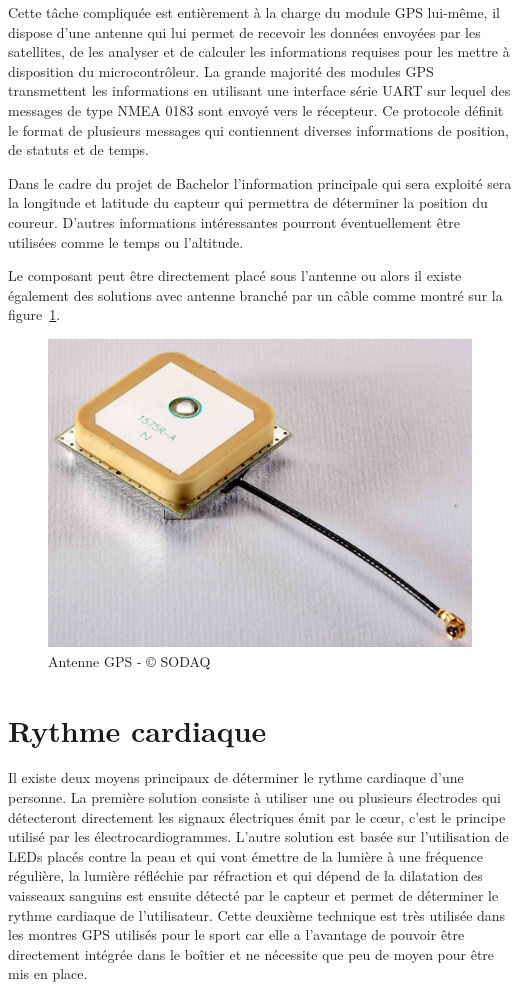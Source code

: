Cette tâche compliquée est entièrement à la charge du module GPS lui-même, il dispose d’une antenne qui lui permet de recevoir les données envoyées par les satellites, de les analyser et de calculer les informations requises pour les mettre à disposition du microcontrôleur.
La grande majorité des modules GPS transmettent les informations en utilisant une interface série UART sur lequel des messages de type NMEA 0183 sont envoyé vers le récepteur. Ce protocole définit le format de plusieurs messages qui contiennent diverses informations de position, de statuts et de temps. \cite{nmea_0183}

Dans le cadre du projet de Bachelor l’information principale qui sera exploité sera la longitude et latitude du capteur qui permettra de déterminer la position du coureur. D’autres informations intéressantes pourront éventuellement être utilisées comme le temps ou l’altitude.

Le composant peut être directement placé sous l’antenne ou alors il existe également des solutions avec antenne branché par un câble comme montré sur la figure~\ref{fig:antenne_gps}.

\begin{figure}[htb]
\centering 
\includegraphics[width=0.5\columnwidth]{../images/active-gps-antenna-large.jpg} 
\caption[Antenne GPS]{Antenne GPS - © SODAQ}
\label{fig:antenne_gps}
\end{figure}

\section{Rythme cardiaque}

Il existe deux moyens principaux de déterminer le rythme cardiaque d’une personne. La première solution consiste à utiliser une ou plusieurs électrodes qui détecteront directement les signaux électriques émit par le cœur, c’est le principe utilisé par les électrocardiogrammes. L’autre solution est basée sur l’utilisation de LEDs placés contre la peau et qui vont émettre de la lumière à une fréquence régulière, la lumière réfléchie par réfraction et qui dépend de la dilatation des vaisseaux sanguins est ensuite détecté par le capteur et permet de déterminer le rythme cardiaque de l’utilisateur. Cette deuxième technique est très utilisée dans les montres GPS utilisés pour le sport car elle a l’avantage de pouvoir être directement intégrée dans le boîtier et ne nécessite que peu de moyen pour être mis en place.

